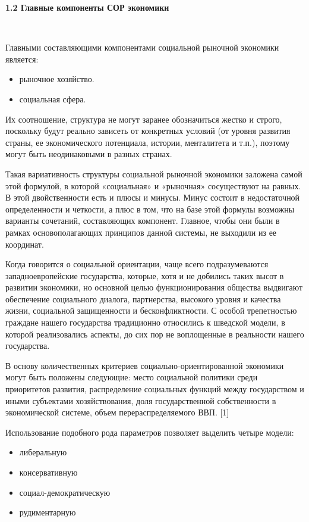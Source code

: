 \documentclass[14pt,a4paper]{article}
\begin{document}
    \begin{center}
        \textbf{1.2 Главные компоненты СОР экономики}
    \end{center}
    \\
    \par
    Главными составляющими компонентами социальной рыночной экономики является:
    \begin{itemize}
        \item рыночное хозяйство.
        \item социальная сфера.
    \end{itemize}
    \par
    Их соотношение, структура не могут заранее обозначиться жестко и строго, поскольку будут реально зависеть от конкретных условий (от уровня развития страны, ее экономического потенциала, истории, менталитета и т.п.), поэтому могут быть неодинаковыми в разных странах.
    \par
    Такая вариативность структуры социальной рыночной экономики заложена самой этой формулой, в которой «социальная» и «рыночная» сосуществуют на равных. В этой двойственности есть и плюсы и минусы. Минус состоит в недостаточной определенности и четкости, а плюс в том, что на базе этой формулы возможны варианты сочетаний, составляющих компонент. Главное, чтобы они были в рамках основополагающих принципов данной системы, не выходили из ее координат.
    \par
    Когда говорится о социальной ориентации, чаще всего подразумеваются западноевропейские государства, которые, хотя и не добились таких высот в развитии экономики, но основной целью функционирования общества выдвигают обеспечение социального диалога, партнерства, высокого уровня и качества жизни, социальной защищенности и бесконфликтности. С особой трепетностью граждане нашего государства традиционно относились к шведской модели, в которой реализовались аспекты, до сих пор не воплощенные в реальности нашего государства.
    \par
    В основу количественных критериев социально-ориентированной экономики могут быть положены следующие: место социальной политики среди приоритетов развития, распределение социальных функций между государством и иными субъектами хозяйствования, доля государственной собственности в экономической системе, объем перераспределяемого ВВП. [1]
    \par
    Использование подобного рода параметров позволяет выделить четыре модели:
    \begin{itemize}
        \item либеральную
        \item консервативную
        \item социал-демократическую
        \item рудиментарную
    \end{itemize}
\end{document}
